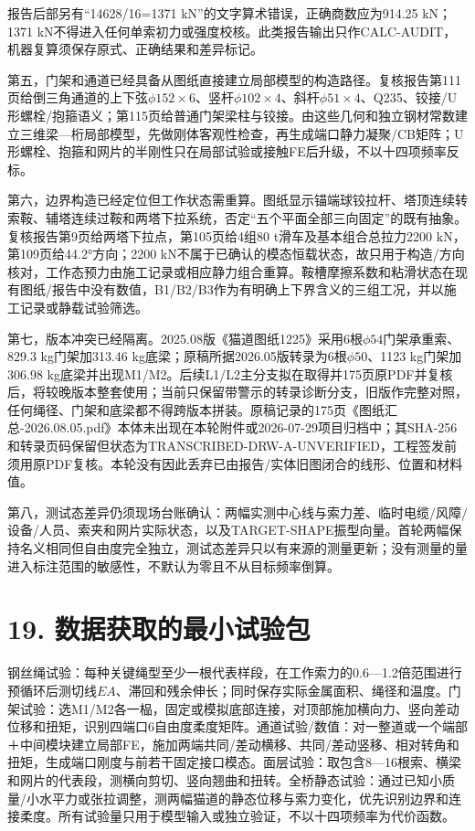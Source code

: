 \documentclass[UTF8,a4paper,11pt,fontset=none]{ctexart}
\begin{document}
报告后部另有“14628/16=1371 kN”的文字算术错误，正确商数应为914.25 kN；1371 kN不得进入任何单索初力或强度校核。此类报告输出只作CALC-AUDIT，机器复算须保存原式、正确结果和差异标记。\par
第五，门架和通道已经具备从图纸直接建立局部模型的构造路径。复核报告第111页给倒三角通道的上下弦\(\phi152\times6\)\allowbreak{}、竖杆\(\phi102\times4\)\allowbreak{}、斜杆\(\phi51\times4\)\allowbreak{}、Q235、铰接/U形螺栓/抱箍语义；第115页给普通门架梁柱与铰接。由这些几何和独立钢材常数建立三维梁—桁局部模型，先做刚体客观性检查，再生成端口静力凝聚/CB矩阵；U形螺栓、抱箍和网片的半刚性只在局部试验或接触FE后升级，不以十四项频率反标。\par
第六，边界构造已经定位但工作状态需重算。图纸显示锚端球铰拉杆、塔顶连续转索鞍、辅塔连续过鞍和两塔下拉系统，否定“五个平面全部三向固定”的既有抽象。复核报告第9页给两塔下拉点，第105页给4组80 t滑车及基本组合总拉力2200 kN，第109页给44.2°方向；2200 kN不属于已确认的模态恒载状态，故只用于构造/方向核对，工作态预力由施工记录或相应静力组合重算。鞍槽摩擦系数和粘滑状态在现有图纸/报告中没有数值，B1/B2/B3作为有明确上下界含义的三组工况，并以施工记录或静载试验筛选。\par
第七，版本冲突已经隔离。2025.08版《猫道图纸1225》采用6根\(\phi54\)\allowbreak{}门架承重索、829.3 kg门架加313.46 kg底梁；原稿所据2026.05版转录为6根\(\phi50\)\allowbreak{}、1123 kg门架加306.98 kg底梁并出现M1/M2。后续L1/L2主分支拟在取得并175页原PDF并复核后，将较晚版本整套使用；当前只保留带警示的转录诊断分支，旧版作完整对照，任何绳径、门架和底梁都不得跨版本拼装。原稿记录的175页《图纸汇总-2026.08.05.pdf》本体未出现在本轮附件或2026-07-29项目归档中；其SHA-256和转录页码保留但状态为TRANSCRIBED-DRW-A-UNVERIFIED，工程签发前须用原PDF复核。本轮没有因此丢弃已由报告/实体旧图闭合的线形、位置和材料值。\par
第八，测试态差异仍须现场台账确认：两幅实测中心线与索力差、临时电缆/风障/设备/人员、索夹和网片实际状态，以及TARGET-SHAPE振型向量。首轮两幅保持名义相同但自由度完全独立，测试态差异只以有来源的测量更新；没有测量的量进入标注范围的敏感性，不默认为零且不从目标频率倒算。\par
{}
\section*{19. 数据获取的最小试验包}
钢丝绳试验：每种关键绳型至少一根代表样段，在工作索力的0.6—1.2倍范围进行预循环后测切线\(EA\)\allowbreak{}、滞回和残余伸长；同时保存实际金属面积、绳径和温度。门架试验：选M1/M2各一榀，固定或模拟底部连接，对顶部施加横向力、竖向差动位移和扭矩，识别四端口6自由度柔度矩阵。通道试验/数值：对一整道或一个端部＋中间模块建立局部FE，施加两端共同/差动横移、共同/差动竖移、相对转角和扭矩，生成端口刚度与前若干固定接口模态。面层试验：取包含8—16根索、横梁和网片的代表段，测横向剪切、竖向翘曲和扭转。全桥静态试验：通过已知小质量/小水平力或张拉调整，测两幅猫道的静态位移与索力变化，优先识别边界和连接柔度。所有试验量只用于模型输入或独立验证，不以十四项频率为代价函数。\par
{}
\end{document}
